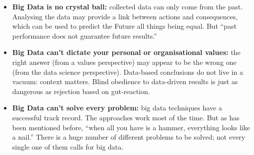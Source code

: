 \begin{itemize}[noitemsep]
\item \textbf{Big Data is no crystal ball:} collected data can only come from the past. Analysing the data may provide a link between actions and consequences, which can be used to predict the Future all things being equal.  But ``past performance does not guarantee future results.''
\item \textbf{Big Data can't dictate your personal or organisational values:} the right answer (from a values perspective) may appear to be the wrong one (from the data science perspective). Data-based conclusions do not live in a vacuum: context matters. Blind obedience to data-driven results is just as dangerous as rejection based on gut-reaction. 
\item \textbf{Big Data can't solve every problem:} big data techniques have a successful track record. The approaches work most of the time. But as has been mentioned before, ``when all you have is a hammer, everything looks like a nail.'' There is a huge number of different problems to be solved; not every single one of them calls for big data.
\end{itemize}
